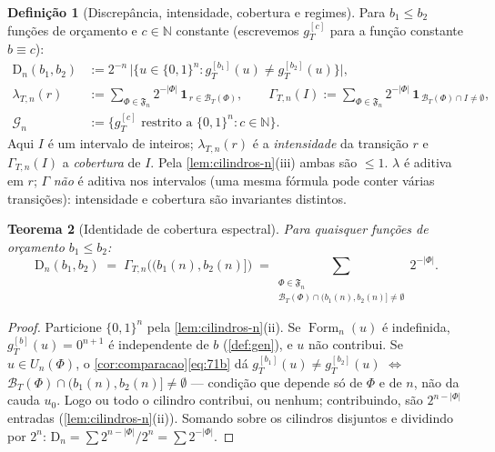\documentclass[11pt,a4paper]{article}
\newtheorem{theorem}{Teorema}[section]
\theoremstyle{definition}
\newtheorem{definition}[theorem]{Definição}
\theoremstyle{remark}
\newcommand{\Fm}{\operatorname{Form}}
\newcommand{\N}{\mathbb{N}}
\begin{document}
\begin{definition}[Discrepância, intensidade, cobertura e regimes]\label{def:cobertura}
Para $b_1 \leq b_2$ funções de orçamento e $c \in \N$ constante
(escrevemos $g_T^{[c]}$ para a função constante $b \equiv c$):
\begin{align}
  \mathrm{D}_n(b_1,b_2) &:= 2^{-n}\, \bigl|\bigl\{u \in \{0,1\}^n :
  g_T^{[b_1]}(u) \neq g_T^{[b_2]}(u)\bigr\}\bigr|,
  \label{eq:Dn}\\
  \lambda_{T,n}(r) &:= \sum_{\Phi \in \mathfrak{F}_n} 2^{-|\Phi|}\,
  \mathbf{1}_{\,r \in \mathcal{B}_T(\Phi)}, \qquad
  \Gamma_{T,n}(I) := \sum_{\Phi \in \mathfrak{F}_n} 2^{-|\Phi|}\,
  \mathbf{1}_{\,\mathcal{B}_T(\Phi) \cap I \neq \emptyset},
  \label{eq:lambdagamma}\\
  \mathcal{G}_n &:= \{g_T^{[c]} \text{ restrito a } \{0,1\}^n :
  c \in \N\}.
  \label{eq:Gn}
\end{align}
Aqui $I$ é um intervalo de inteiros; $\lambda_{T,n}(r)$ é a
\emph{intensidade} da transição $r$ e $\Gamma_{T,n}(I)$ a
\emph{cobertura} de $I$. Pela \cref{lem:cilindros-n}(iii) ambas são
$\leq 1$. $\lambda$ é aditiva em $r$; $\Gamma$ \emph{não} é aditiva
nos intervalos (uma mesma fórmula pode conter várias transições):
intensidade e cobertura são invariantes distintos.
\end{definition}

\begin{theorem}[Identidade de cobertura espectral]\label{thm:cobertura}
Para quaisquer funções de orçamento $b_1 \leq b_2$:
\begin{equation}\label{eq:cobertura}
  \mathrm{D}_n(b_1,b_2)
  \;=\; \Gamma_{T,n}\bigl(\bigl(b_1(n), b_2(n)\bigr]\bigr)
  \;=\!\! \sum_{\substack{\Phi \in \mathfrak{F}_n\\
      \mathcal{B}_T(\Phi) \cap (b_1(n), b_2(n)] \neq \emptyset}}\!\! 2^{-|\Phi|}.
\end{equation}
\end{theorem}

\begin{proof}
Particione $\{0,1\}^n$ pela \cref{lem:cilindros-n}(ii). Se $\Fm_n(u)$
é indefinida, $g_T^{[b]}(u) = 0^{n+1}$ é independente de $b$
(\cref{def:gen}), e $u$ não contribui. Se $u \in U_n(\Phi)$, o
\cref{cor:comparacao}\eqref{eq:71b} dá
$g_T^{[b_1]}(u) \neq g_T^{[b_2]}(u)$ $\iff$
$\mathcal{B}_T(\Phi) \cap (b_1(n), b_2(n)] \neq \emptyset$ --- condição
que depende só de $\Phi$ e de $n$, não da cauda $u_0$. Logo ou todo o
cilindro contribui, ou nenhum; contribuindo, são $2^{n - |\Phi|}$
entradas (\cref{lem:cilindros-n}(ii)). Somando sobre os cilindros
disjuntos e dividindo por $2^n$:
$\mathrm{D}_n = \sum 2^{n - |\Phi|} / 2^n = \sum 2^{-|\Phi|}$.
\end{proof}
\end{document}
